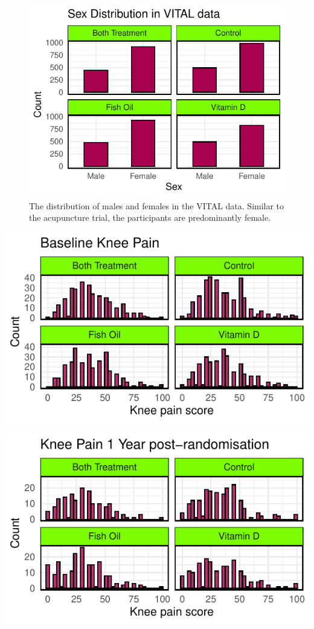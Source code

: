 \documentclass{article}
\newcommand{\pandocbounded}[1]{#1}
\begin{document}
\begin{figure}
\centering
\pandocbounded{\includegraphics[keepaspectratio]{Final_Report_files/figure-latex/unnamed-chunk-18-1.pdf}}
\caption{The distribution of males and females in the VITAL data.
Similar to the acupuncture trial, the participants are predominantly
female.}
\end{figure}

\pandocbounded{\includegraphics[keepaspectratio]{Final_Report_files/figure-latex/unnamed-chunk-19-1.pdf}}

\pandocbounded{\includegraphics[keepaspectratio]{Final_Report_files/figure-latex/unnamed-chunk-20-1.pdf}}
\end{document}
